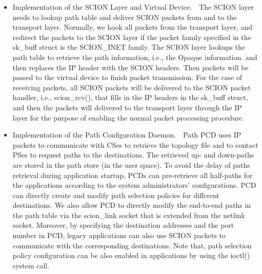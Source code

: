 \begin{itemize}
\item{Implementation of the SCION Layer and Virtual Device.}\ \
The SCION layer needs to lookup path table and deliver SCION packets
from and to the transport layer. Normally, we hook all packets from
the transport layer, and redirect the packets to the SCION layer if
the packet family specified in the sk\_buff struct is the
SCION\_INET family. The SCION layer lookups the path table to
retrieve the path information,
i.e., the Opaque information. %
and then replaces the IP header with the SCION headers. %
Then packets will be passed to the virtual device to finish packet
transmission. For the case of receiving packets, all SCION packets
will be delivered to the SCION packet handler, i.e., scion\_rcv(),
that fills in the IP headers in the sk\_buff struct, and then the
packets will delivered to the transport layer through the IP layer
for the purpose of enabling the normal packet processing procedure.

\item{Implementation of the Path Configuration Daemon.}\ \  Path PCD uses IP
packets to communicate with CSes to retrieve the topology file and
to contact PSes to request paths to the destinations. %
The retrieved up- and down-paths are stored in the path store (in
the user space). To avoid the delay of paths retrieval during
application startup, PCDs can pre-retrieve all half-paths for the
applications according to the system administrators' configurations.
PCD can directly create and modify path selection policies for
different destinations. We also allow PCD to directly modify the
end-to-end paths in the path table via the scion\_link socket that
is extended from the netlink socket.
Moreover, by specifying the destination addresses and the port
number in PCD, legacy applications can also use SCION packets to
communicate with the corresponding destinations. Note that, path
selection policy configuration can be also enabled in applications
by using the ioctl() system call.


\end{itemize}
